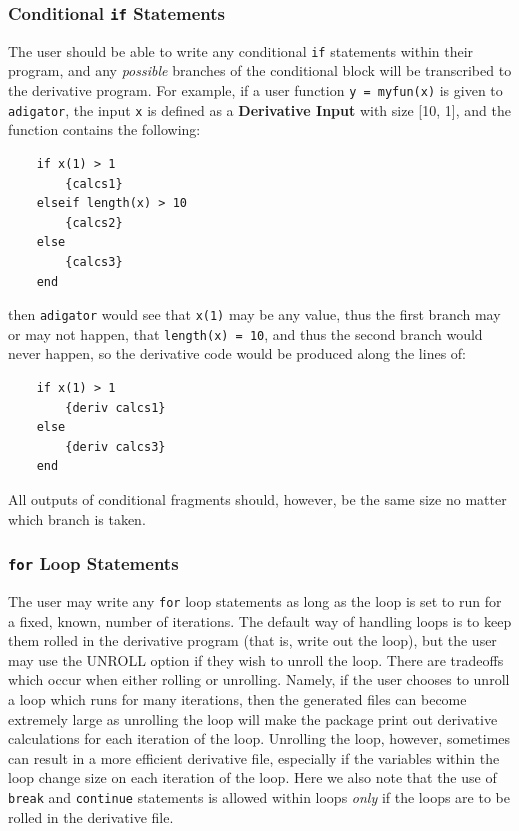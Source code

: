 \documentclass[10pt,pdftex]{article}
\begin{document}
\subsubsection{Conditional \texttt{if} Statements}
The user should be able to write any conditional \texttt{if} statements within their program, and any \emph{possible} branches of the conditional block will be transcribed to the derivative program. For example, if a user function \texttt{y = myfun(x)} is given to \texttt{adigator}, the input \texttt{x} is defined as a {\bf Derivative Input} with size [10, 1], and the function contains the following:
\begin{verbatim}
    if x(1) > 1
        {calcs1}
    elseif length(x) > 10
        {calcs2}
    else
        {calcs3}
    end
\end{verbatim} 
then \texttt{adigator} would see that \texttt{x(1)} may be any value, thus the first branch may or may not happen, that \texttt{length(x) = 10}, and thus the second branch would never happen, so the derivative code would be produced along the lines of:
\begin{verbatim}
    if x(1) > 1
        {deriv calcs1}
    else
        {deriv calcs3}
    end
\end{verbatim}
All outputs of conditional fragments should, however, be the same size no matter which branch is taken.
\subsubsection{\texttt{for} Loop Statements}
The user may write any \texttt{for} loop statements as long as the loop is set to run for a fixed, known, number of iterations. The default way of handling loops is to keep them rolled in the derivative program (that is, write out the loop), but the user may use the UNROLL option if they wish to unroll the loop. There are tradeoffs which occur when either rolling or unrolling. Namely, if the user chooses to unroll a loop which runs for many iterations, then the generated files can become extremely large as unrolling the loop will make the package print out derivative calculations for each iteration of the loop. Unrolling the loop, however, sometimes can result in a more efficient derivative file, especially if the variables within the loop change size on each iteration of the loop. Here we also note that the use of \texttt{break} and \texttt{continue} statements is allowed within loops \emph{only} if the loops are to be rolled in the derivative file.
\end{document}
